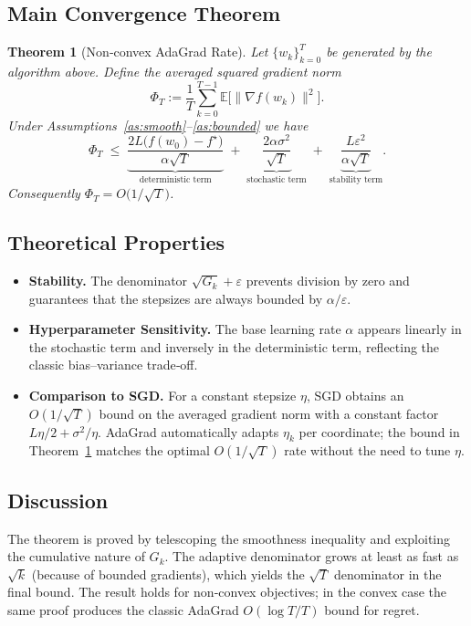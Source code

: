 \documentclass{article}
\newtheorem{theorem}{Theorem}
\newcommand{\E}{\mathbb{E}}
\begin{document}
\subsection*{Main Convergence Theorem}
\begin{theorem}[Non‑convex AdaGrad Rate]\label{thm:main}
Let $\{w_{k}\}_{k=0}^{T}$ be generated by the algorithm above.
Define the averaged squared gradient norm
\[
\Phi_{T}:=\frac{1}{T}\sum_{k=0}^{T-1}\E\bigl[\|\nabla f(w_{k})\|^{2}\bigr].
\]
Under Assumptions~\ref{as:smooth}–\ref{as:bounded} we have
\[
\Phi_{T}\;\le\;
\underbrace{\frac{2L\bigl(f(w_{0})-f^{\star}\bigr)}{\alpha\sqrt{T}}}_{\text{deterministic term}}
\;+\;
\underbrace{\frac{2\alpha\sigma^{2}}{\sqrt{T}}}_{\text{stochastic term}}
\;+\;
\underbrace{\frac{L\varepsilon^{2}}{\alpha\sqrt{T}}}_{\text{stability term}} .
\]
Consequently $\Phi_{T}=O\!\bigl(1/\sqrt{T}\bigr)$.
\end{theorem}

\subsection*{Theoretical Properties}
\begin{itemize}
\item \textbf{Stability.} The denominator $\sqrt{G_{k}}+\varepsilon$ prevents division
by zero and guarantees that the stepsizes are always bounded by $\alpha/\varepsilon$.
\item \textbf{Hyperparameter Sensitivity.}
  The base learning rate $\alpha$ appears linearly in the stochastic term
  and inversely in the deterministic term, reflecting the classic bias–variance trade‑off.
\item \textbf{Comparison to SGD.}
  For a constant stepsize $\eta$, SGD obtains an $O(1/\sqrt{T})$ bound on the
  averaged gradient norm with a constant factor $L\eta/2+\sigma^{2}/\eta$.
  AdaGrad automatically adapts $\eta_{k}$ per coordinate; the bound in Theorem~\ref{thm:main}
  matches the optimal $O(1/\sqrt{T})$ rate without the need to tune $\eta$.
\end{itemize}

\subsection*{Discussion}
The theorem is proved by telescoping the smoothness inequality and exploiting the
cumulative nature of $G_{k}$.  The adaptive denominator grows at least as fast as
$\sqrt{k}$ (because of bounded gradients), which yields the $\sqrt{T}$ denominator in the final bound.
The result holds for non‑convex objectives; in the convex case the same proof
produces the classic AdaGrad $O(\log T / T)$ bound for regret.
\end{document}
